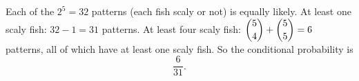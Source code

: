 Each of the $2^5=32$ patterns (each fish scaly or not) is equally likely. At least one scaly fish: $32-1=31$ patterns. At least four scaly fish: $\dbinom54+\dbinom55=6$ patterns, all of which have at least one scaly fish. So the conditional probability is
\[\boxed{\dfrac{6}{31}}.\]
